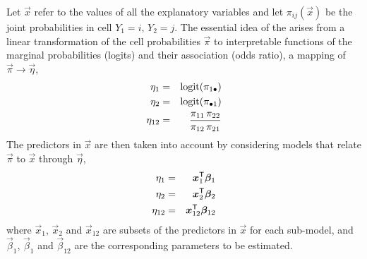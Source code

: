 \documentclass[11pt]{book}\usepackage[]{graphicx}\usepackage[]{color}
\begin{document}
Let $\vec{x}$
refer to the values of all the explanatory variables and let $\pi _{ij}\left(
\vec{x}\right) $ be the joint probabilities in cell $Y_1=i,\,Y_2=j$.
The essential idea of the
 arises from a linear transformation of the
cell probabilities $\vec{\pi}$ to interpretable functions of the marginal
probabilities (logits) and their association (odds ratio),
a mapping of $\vec{\pi} \to \vec{\eta}$,
\begin{eqnarray}
\eta_1    & = & \logit (\pi_{1\bullet })                    \nonumber  \\
\eta_2    & = & \logit (\pi_{\bullet 1})                    \label{eq:blogits}  \\
\eta_{12} & = & \frac{\pi_{11} \, \pi_{22}}{\pi_{12} \, \pi_{21}} \nonumber
\end{eqnarray}
The predictors in $\vec{x}$ are then taken into account by considering models
that relate $\vec{\pi}$ to $\vec{x}$ through $\vec{\eta}$,
\begin{eqnarray}
\eta_1    & = & \bm{x}_1 ^\mathsf{T} \bm{\beta}_1     \nonumber  \\
\eta_2    & = & \bm{x}_2 ^\mathsf{T} \bm{\beta}_2      \label{eq:blogits2} \\
\eta_{12} & = & \bm{x}_{12} ^\mathsf{T} \bm{\beta}_{12} \nonumber
\end{eqnarray}
where $\vec{x}_1$, $\vec{x}_2$ and $\vec{x}_{12}$ are subsets of the predictors
in $\vec{x}$ for each sub-model, and $\vec{\beta}_1$, $\vec{\beta}_1$ and
$\vec{\beta}_{12}$ are the corresponding parameters to be estimated.
\end{document}
